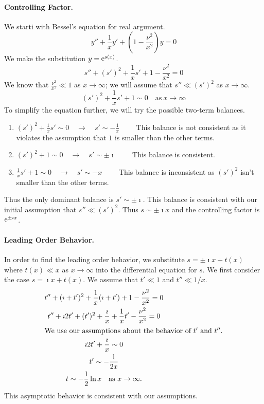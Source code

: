 \paragraph{Controlling Factor.}
We starti with Bessel's equation for real argument.
\[ 
y'' + \frac{1}{x} y' + \left(1 - \frac{\nu^2}{x^2} \right) y = 0
\]
We make the substitution $y = \mathop{\mathrm{e}}\nolimits^{s(x)}$.
\[
s'' + (s')^2 + \frac{1}{x} s' + 1 - \frac{\nu^2}{x^2} = 0
\] 
We know that $\frac{\nu^2}{x^2} \ll 1$ as $x \to \infty$;  we will assume
that $s'' \ll (s')^2$ as $x \to \infty$.
\[ 
(s')^2 + \frac{1}{x} s' + 1 \sim 0 \quad \mathrm{as}\ x \to \infty
\]
To simplify the equation further, we will try the possible two-term balances.
\begin{enumerate}
\item
  $(s')^2 + \frac{1}{x} s' \sim 0 \quad \to \quad s' \sim -\frac{1}{x} \qquad$
  This balance is not consistent as it violates the assumption that
  $1$ is smaller than the other terms.
\item
  $(s')^2 + 1 \sim 0 \quad        \to \quad      s' \sim \pm \imath \qquad$
  This balance is consistent.
\item
  $\frac{1}{x} s' + 1 \sim 0 \quad \to \quad s' \sim -x \qquad$
  This balance is inconsistent as $(s')^2$ isn't smaller than the other terms.
\end{enumerate}

Thus the only dominant balance is $s' \sim \pm \imath$.  
This balance is consistent with our initial assumption that $s'' \ll (s')^2$.
Thus $s \sim \pm \imath x$ and the controlling factor is $\mathop{\mathrm{e}}\nolimits^{\pm \imath x}$.




\paragraph{Leading Order Behavior.}
In order to find the leading order behavior, we substitute $s = \pm \imath x 
+ t(x)$ where $t(x) \ll x$ as $x \to \infty$ into the differential equation
for $s$.  We first consider the case $s = \imath x + t(x)$.
We assume that $t' \ll 1$ and $t'' \ll 1/x$.
\begin{gather*}
  t'' + (\imath + t')^2 + \frac{1}{x}(\imath + t') + 1 - \frac{\nu^2}{x^2} = 0 
  \\
  t'' + \imath 2 t' + (t')^2 + \frac{\imath}{x} + \frac{1}{x} t' - \frac{\nu^2}{x^2} = 0
  \\
  \intertext{We use our assumptions about the behavior of $t'$ and $t''$.}
  \imath 2 t' + \frac{\imath}{x} \sim 0 
  \\
  t' \sim -\frac{1}{2 x} \\
  t \sim - \frac{1}{2} \ln x \quad \mathrm{as}\ x \to \infty.
\end{gather*}
This asymptotic behavior is consistent with our assumptions.

